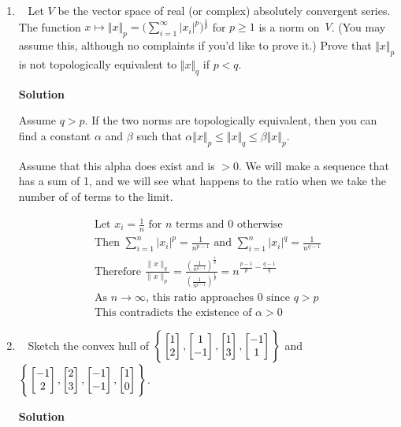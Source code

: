 \documentclass[11pt]{article}
\makeatletter
\newcommand\red[1]{\marginpar{\linespread{.85}\sf%
		   \vspace{-1.4ex}\footnotesize{\color{red}#1}}}
\newcommand\score[1]{\marginpar{\vspace{-2ex}\color{blue}{#1/3}}\hspace{-1ex}}
\newcommand\0{\mathbf{0}}
\newcommand\<{\langle}
\renewcommand\>{\rangle}
\newcommand\tworow[1]{\left[\begin{array}{@{}c@{}}#1\end{array}\right]}
\makeatother
\begin{document}
\begin{enumerate}
\item\ \score{3}%
Let $V$ be the vector space of real (or complex) absolutely convergent
series.  The function $x \mapsto \Vert x \Vert_p =
\big(\sum_{i=1}^\infty |x_i|^p\big){}^{\frac 1p}$ for $p \geq 1$ is a
norm on~$V$.  (You may assume this, although no complaints if you'd
like to prove it.)  Prove that $\Vert x \Vert_p$ is not topologically
equivalent to $\Vert x \Vert_q$ if $p < q$.

\textbf{Solution}

Assume $q>p$. If the two norms are topologically equivalent, then you can find a constant $\alpha$ and $\beta$ such 
that $\alpha \Vert x \Vert_p \leq \Vert x \Vert_q \leq \beta \Vert x \Vert_p$.

Assume that this alpha does exist and is $>0$. We will make a sequence that 
has a sum of 1, and we will see what happens to the ratio when we take the number of
of terms to the limit.

\begin{align*}
  \text{Let } x_i = \frac{1}{n} \text{ for } n \text{ terms and } 0 \text{ otherwise}\\
  \text{Then } \sum_{i=1}^n |x_i|^p = \frac{1}{n^{p-1}} \text{ and } \sum_{i=1}^n |x_i|^q = \frac{1}{n^{q-1}}\\
  \text{Therefore } \frac{\|x\|_q}{\|x\|_p} = \frac{(\frac{1}{n^{q-1}})^{\frac{1}{q}}}{(\frac{1}{n^{p-1}})^{\frac{1}{p}}} = n^{\frac{p-1}{p} - \frac{q-1}{q}}\\
  \text{As } n \to \infty \text{, this ratio approaches } 0 \text{ since } q > p\\
  \text{This contradicts the existence of } \alpha > 0
\end{align*}

\pagebreak

\item\ \score{3}%
Sketch the convex hull of \red{Nice use of Tikz}
$\Bigg\{\tworow{1\\2},\tworow{1\\-1},\tworow{1\\3},\tworow{-1\\1}\Bigg\}$
and
$\Bigg\{\tworow{-1\\2},\tworow{2\\3},\tworow{-1\\-1},\tworow{1\\0}\Bigg\}$.

\textbf{Solution}

\begin{center}
\end{center}
\end{enumerate}
\end{document}
